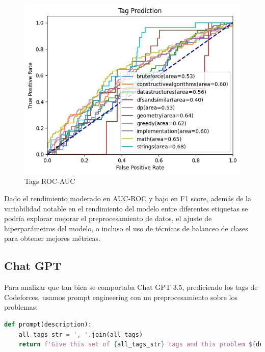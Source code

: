\documentclass{article}
\begin{document}
\begin{figure}[H]
    \centering
    \includegraphics[scale=0.55]{imgs/roc_auc.jpg}
    \caption{Tags ROC-AUC}
\end{figure}

Dado el rendimiento moderado en AUC-ROC y bajo en F1 score, además de la variabilidad notable en 
el rendimiento del modelo entre diferentes etiquetas se podría explorar mejorar el 
preprocesamiento de datos, el ajuste de hiperparámetros del modelo, o incluso el uso de técnicas 
de balanceo de clases para obtener mejores métricas.


\subsection{Chat GPT}

Para analizar que tan bien se comportaba Chat GPT 3.5, prediciendo los tags de Codeforces, usamos prompt engineering
con un preprocesamiento sobre los problemas:

\begin{lstlisting}[language=Python, caption=Prompt para tagear los problemas]
def prompt(description):
    all_tags_str = ', '.join(all_tags)
    return f'Give this set of {all_tags_str} tags and this problem ${description}, give me the set of problem tags in the following format: greedy, implementation, dp'
\end{lstlisting}
\end{document}
